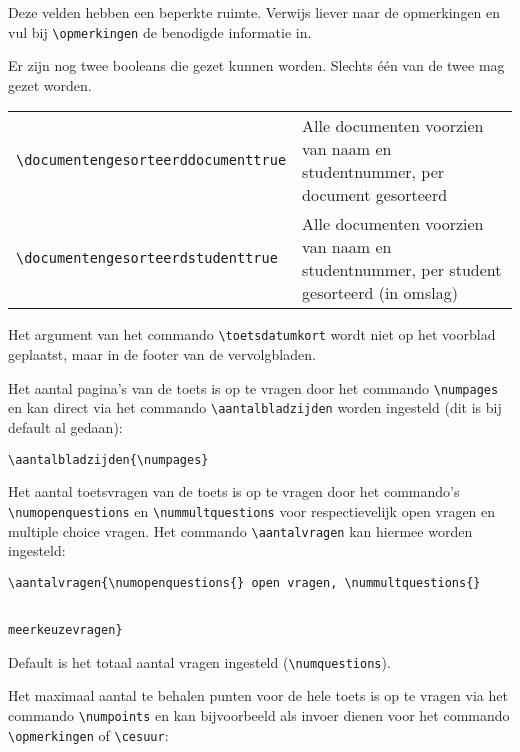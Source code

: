\documentclass[dutch,a4paper,12pt,addpoints,fleqn,oneside]{tisdexam}
\begin{document}
\bigskip
Deze velden hebben een beperkte ruimte. Verwijs liever naar de opmerkingen en vul bij \verb|\opmerkingen|
de benodigde informatie in.

\bigskip
Er zijn nog twee booleans die gezet kunnen worden. Slechts \'e\'en van de twee mag gezet worden.

\bigskip
\begin{tabular}{lp{9cm}}
\verb|\documentengesorteerddocumenttrue| & Alle documenten voorzien van naam en studentnummer, per document gesorteerd \\
\verb|\documentengesorteerdstudenttrue| & Alle documenten voorzien van naam en studentnummer, per student gesorteerd (in omslag) \\
\end{tabular}


\medskip
Het argument van het commando \verb|\toetsdatumkort| wordt niet op het voorblad
geplaatst, maar in de footer van de vervolgbladen.

\medskip
Het aantal pagina's van de toets is op te vragen door het commando \verb|\numpages| en
kan direct via het commando \verb|\aantalbladzijden| worden ingesteld (dit is bij default
al gedaan):

\bigskip
\verb|\aantalbladzijden{\numpages}|

\bigskip
Het aantal toetsvragen van de toets is op te vragen door het commando's \verb|\numopenquestions| en
\verb|\nummultquestions| voor respectievelijk open vragen en multiple choice vragen.
Het commando \verb|\aantalvragen| kan hiermee worden ingesteld:

\bigskip
\verb|\aantalvragen{\numopenquestions{} open vragen, \nummultquestions{}|

\verb|                                                       meerkeuzevragen}|

Default is het totaal aantal vragen ingesteld (\verb|\numquestions|).


\bigskip
Het maximaal aantal te behalen punten voor de hele toets is op te vragen via het commando
\verb|\numpoints| en kan bijvoorbeeld als invoer dienen voor het commando \verb|\opmerkingen| of
\verb|\cesuur|:
\end{document}
